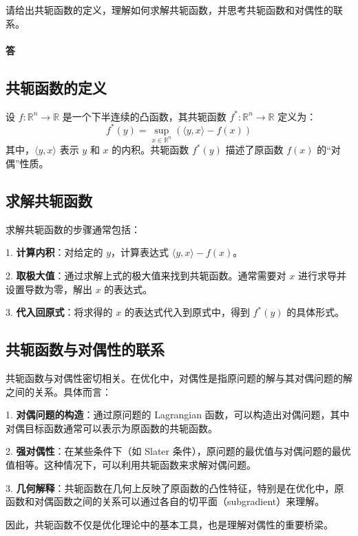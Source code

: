 \documentclass[a4paper]{article}
\begin{document}
请给出共轭函数的定义，理解如何求解共轭函数，并思考共轭函数和对偶性的联系。

\paragraph{答}

\subsection{共轭函数的定义}

设 $f: \mathbb{R}^n \to \mathbb{R}$ 是一个下半连续的凸函数，其共轭函数 $f^*: \mathbb{R}^n \to \mathbb{R}$ 定义为：
\[
f^*(y) = \sup_{x \in \mathbb{R}^n} \left( \langle y, x \rangle - f(x) \right)
\]
其中，$\langle y, x \rangle$ 表示 $y$ 和 $x$ 的内积。共轭函数 $f^*(y)$ 描述了原函数 $f(x)$ 的“对偶”性质。

\subsection{求解共轭函数}

求解共轭函数的步骤通常包括：

1. \textbf{计算内积}：对给定的 $y$，计算表达式 $ \langle y, x \rangle - f(x) $。

2. \textbf{取极大值}：通过求解上式的极大值来找到共轭函数。通常需要对 $x$ 进行求导并设置导数为零，解出 $x$ 的表达式。

3. \textbf{代入回原式}：将求得的 $x$ 的表达式代入到原式中，得到 $f^*(y)$ 的具体形式。

\subsection{共轭函数与对偶性的联系}

共轭函数与对偶性密切相关。在优化中，对偶性是指原问题的解与其对偶问题的解之间的关系。具体而言：

1. \textbf{对偶问题的构造}：通过原问题的 Lagrangian 函数，可以构造出对偶问题，其中对偶目标函数通常可以表示为原函数的共轭函数。

2. \textbf{强对偶性}：在某些条件下（如 Slater 条件），原问题的最优值与对偶问题的最优值相等。这种情况下，可以利用共轭函数来求解对偶问题。

3. \textbf{几何解释}：共轭函数在几何上反映了原函数的凸性特征，特别是在优化中，原函数和对偶函数之间的关系可以通过各自的切平面（subgradient）来理解。

因此，共轭函数不仅是优化理论中的基本工具，也是理解对偶性的重要桥梁。
\end{document}
